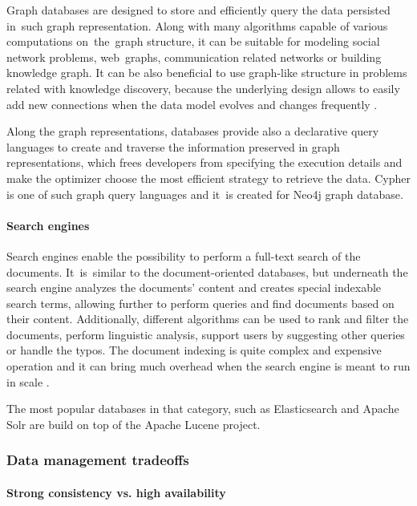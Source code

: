 Graph databases are designed to store and efficiently query the data persisted in~such graph representation. Along with many algorithms capable of various computations on~the~graph structure, it can be suitable for modeling social network problems, web~graphs, communication related networks or building knowledge graph. It can be also beneficial to use graph-like structure in problems related with knowledge discovery, because the underlying design allows to easily add new connections when the data model evolves and changes frequently \cite{DesignDataIntensiveApplications}.

Along the graph representations, databases provide also a declarative query languages to create and traverse the information preserved in graph representations, which frees developers from specifying the execution details and make the optimizer choose the most efficient strategy to retrieve the data. Cypher is one of such graph query languages and it~is created for Neo4j \cite{Neo4j} graph database.

\paragraph{Search engines}

Search engines enable the possibility to perform a full-text search of the documents. It~is~similar to the document-oriented databases, but underneath the search engine analyzes the documents' content and creates special indexable search terms, allowing further to perform queries and find documents based on their content. Additionally, different algorithms can be used to rank and filter the documents, perform linguistic analysis, support users by suggesting other queries or handle the typos. The document indexing is quite complex and expensive operation and it can bring much overhead when the search engine is meant to run in scale \cite{DesignDataIntensiveApplications}. 

The most popular databases in that category, such as Elasticsearch \cite{Elasticsearch} and Apache Solr \cite{ApacheSolr} are build on top of the Apache Lucene project.

\subsubsection{Data management tradeoffs} \label{chapter:database-management-tradeoffs}

\paragraph{Strong consistency vs. high availability}


